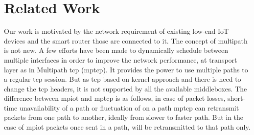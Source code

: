 \section{Related Work}
Our work is motivated by the network requirement of existing low-end IoT devices and the smart router those are connected to it. 
The concept of multipath is not new. A few efforts have been made to dynamically schedule between multiple interfaces in order to 
improve the network performance, at transport layer as in Multipath \acrshort{tcp} (\acrshort{mptcp}). It provides the power 
to use multiple paths to a regular \acrshort{tcp} session. But as \acrshort{tcp} based on kernel approach and there is need to change 
the \acrshort{tcp} headers, it is not supported by all the available middleboxes. The difference between \acrshort{mpiot} and 
\acrshort{mptcp} is as follows, in case of packet losses, short-time unavailability of a path or fluctuation of on a path \acrshort{mptcp} 
can retransmit packets from one path to another, ideally from slower to faster path. But in the case of \acrshort{mpiot} packets once sent in a path,
will be retransmitted to that path only.
